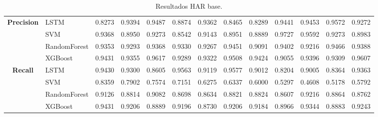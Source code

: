 \begin{table}[h]
\begin{adjustbox}{max width=15cm}
\begin{tabular}{|c|l|r|r|r|r|r|r|r|r|r|r|r|}
			\hline
			\textbf{Precision} & LSTM &  0.8273 &  0.9394 &  0.9487 &  0.8874 &  0.9362 &  0.8465 &  0.8289 &  0.9441 &  0.9453 &  0.9572 &  0.9272 \\
			& SVM &  0.9368 &  0.8950 &  0.9273 &  0.8542 &  0.9143 &  0.8951 &  0.8889 &  0.9727 &  0.9592 &  0.9273 &  0.8983 \\
			& RandomForest &  0.9353 &  0.9293 &  0.9368 &  0.9330 &  0.9267 &  0.9451 &  0.9091 &  0.9402 &  0.9216 &  0.9466 &  0.9388 \\
			& XGBoost &  0.9431 &  0.9355 &  0.9617 &  0.9289 &  0.9322 &  0.9508 &  0.9424 &  0.9055 &  0.9396 &  0.9309 &  0.9607 \\
			\hline
			\textbf{Recall} & LSTM &  0.9430 &  0.9300 &  0.8605 &  0.9563 &  0.9119 &  0.9577 &  0.9012 &  0.8204 &  0.9005 &  0.8364 &  0.9363 \\
			& SVM &  0.8359 &  0.7902 &  0.7574 &  0.7151 &  0.6275 &  0.6337 &  0.6000 &  0.5297 &  0.4608 &  0.5178 &  0.5792 \\
			& RandomForest &  0.9126 &  0.8814 &  0.9082 &  0.8698 &  0.8634 &  0.8821 &  0.8824 &  0.8607 &  0.9216 &  0.8864 &  0.8762 \\
			& XGBoost &  0.9431 &  0.9206 &  0.8889 &  0.9196 &  0.8730 &  0.9206 &  0.9184 &  0.8966 &  0.9344 &  0.8883 &  0.9243 \\
			\hline
		\end{tabular}
	\end{adjustbox}
	\caption{Resultados HAR base.}
	\label{tab:HAR_base}
\end{table}
